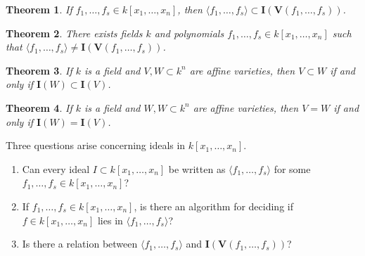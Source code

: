 \documentclass[oneside]{book}
\theoremstyle{mystyle}
\newtheorem{theorem}{Theorem}[section]
\begin{document}
\begin{theorem}
If $f_1,\hdots, f_s \in k[x_1,\hdots ,x_n]$, then $\langle f_1,\hdots, f_s \rangle \subset \mathbf{I}(\mathbf{V}(f_1,\hdots, f_s))$.
\end{theorem}
\begin{theorem}
There exists fields $k$ and polynomials $f_1,\hdots, f_s\in k[x_1,\hdots ,x_n]$ such that $\langle f_1,\hdots,f_s\rangle \ne \mathbf{I}(\mathbf{V}(f_1,\hdots, f_s))$.
\end{theorem}
\begin{theorem}
If $k$ is a field and $V,W\subset k^n$ are affine varieties, then $V\subset W$ if and only if $\mathbf{I}(W)\subset \mathbf{I}(V)$.
\end{theorem}
\begin{theorem}
If $k$ is a field and $W,W\subset k^n$ are affine varieties, then $V=W$ if and only if $\mathbf{I}(W)=\mathbf{I}(V)$.
\end{theorem}
Three questions arise concerning ideals in $k[x_1,\hdots ,x_n]$.
\begin{enumerate}
    \item Can every ideal $I\subset k[x_1,\hdots ,x_n]$ be written as $\langle f_1,\hdots, f_s\rangle$ for some $f_1,\hdots, f_s \in k[x_1,\hdots ,x_n]$?
    \item If $f_1,\hdots, f_s\in k[x_1,\hdots ,x_n]$, is there an algorithm for deciding if $f\in k[x_1,\hdots ,x_n]$ lies in $\langle f_1,\hdots, f_s\rangle$?
    \item Is there a relation between $\langle f_1,\hdots, f_s\rangle$ and $\mathbf{I}(\mathbf{V}(f_1,\hdots, f_s))$?
\end{enumerate}
\end{document}
